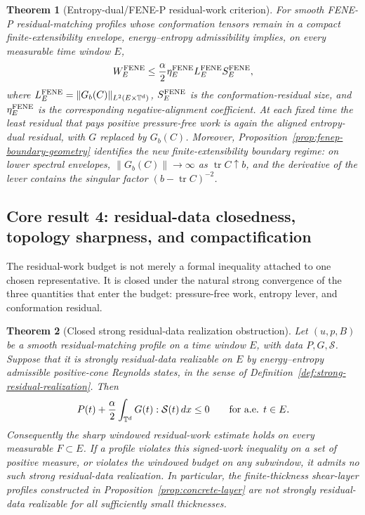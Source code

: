 \documentclass[11pt]{article}
\numberwithin{equation}{section}
\newtheorem{maintheorem}{Theorem}
\newcommand{\norm}[1]{\left\lVert #1\right\rVert}
\begin{document}
\begin{maintheorem}[Entropy-dual/FENE-P residual-work criterion]
\label{thm:intro-fenep}
For smooth FENE-P residual-matching profiles whose conformation tensors remain
in a compact finite-extensibility envelope, energy--entropy admissibility
implies, on every measurable time window \(E\),
\[
  W_E^{\rm FENE}
  \le
  \frac{\alpha}{2}\eta_E^{\rm FENE}
  L_E^{\rm FENE}S_E^{\rm FENE},
\]
where \(L_E^{\rm FENE}=\|G_b(C)\|_{L^2(E\times\mathbb T^d)}\),
\(S_E^{\rm FENE}\) is the conformation-residual size, and
\(\eta_E^{\rm FENE}\) is the corresponding negative-alignment coefficient.
At each fixed time the least residual that pays positive pressure-free work is
again the aligned entropy-dual residual, with \(G\) replaced by \(G_b(C)\).
Moreover, Proposition~\ref{prop:fenep-boundary-geometry} identifies the new
finite-extensibility boundary regime: on lower spectral envelopes,
\(\norm{G_b(C)}\to\infty\) as \(\operatorname{tr}C\uparrow b\), and the
derivative of the lever contains the singular factor
\((b-\operatorname{tr}C)^{-2}\).
\end{maintheorem}

\subsection*{Core result 4: residual-data closedness, topology sharpness, and compactification}

The residual-work budget is not merely a formal inequality attached to one
chosen representative.  It is closed under the natural strong convergence of the
three quantities that enter the budget: pressure-free work, entropy lever, and
conformation residual.

\begin{maintheorem}[Closed strong residual-data realization obstruction]
\label{thm:intro-closed-realization}
Let \((u,p,B)\) be a smooth residual-matching profile on a time window \(E\),
with data \(P,G,\mathcal S\).  Suppose that it is strongly residual-data
realizable on \(E\) by energy--entropy admissible positive-cone Reynolds states,
in the sense of Definition~\ref{def:strong-residual-realization}.  Then
\[
  P(t)+\frac{\alpha}{2}\int_{\mathbb T^d}G(t):\mathcal S(t)\,dx\le0
  \qquad\hbox{for a.e. }t\in E.
\]
Consequently the sharp windowed residual-work estimate holds on every
measurable \(F\subset E\).  If a profile violates this signed-work inequality on
a set of positive measure, or violates the windowed budget on any subwindow, it
admits no such strong residual-data realization.  In particular, the
finite-thickness shear-layer profiles constructed in
Proposition~\ref{prop:concrete-layer} are not strongly residual-data realizable
for all sufficiently small thicknesses.
\end{maintheorem}
\end{document}
